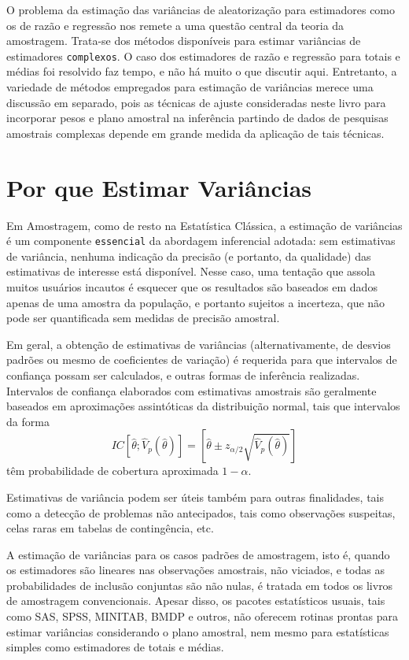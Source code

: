 \documentclass[]{book}
\numberwithin{example}{chapter}
\numberwithin{remark}{chapter}
\numberwithin{definition}{chapter}
\begin{document}
O problema da estimação das variâncias de aleatorização para estimadores
como os de razão e regressão nos remete a uma questão central da teoria
da amostragem. Trata-se dos métodos disponíveis para estimar variâncias
de estimadores \texttt{complexos}. O caso dos estimadores de razão e
regressão para totais e médias foi resolvido faz tempo, e não há muito o
que discutir aqui. Entretanto, a variedade de métodos empregados para
estimação de variâncias merece uma discussão em separado, pois as
técnicas de ajuste consideradas neste livro para incorporar pesos e
plano amostral na inferência partindo de dados de pesquisas amostrais
complexas depende em grande medida da aplicação de tais técnicas.

\section{Por que Estimar Variâncias}\label{por-que-estimar-variancias}

Em Amostragem, como de resto na Estatística Clássica, a estimação de
variâncias é um componente \texttt{essencial} da abordagem inferencial
adotada: sem estimativas de variância, nenhuma indicação da precisão (e
portanto, da qualidade) das estimativas de interesse está disponível.
Nesse caso, uma tentação que assola muitos usuários incautos é esquecer
que os resultados são baseados em dados apenas de uma amostra da
população, e portanto sujeitos a incerteza, que não pode ser
quantificada sem medidas de precisão amostral.

Em geral, a obtenção de estimativas de variâncias (alternativamente, de
desvios padrões ou mesmo de coeficientes de variação) é requerida para
que intervalos de confiança possam ser calculados, e outras formas de
inferência realizadas. Intervalos de confiança elaborados com
estimativas amostrais são geralmente baseados em aproximações
assintóticas da distribuição normal, tais que intervalos da forma \[
IC\left[ \widehat{\theta };\widehat{V}_{p}\left( \widehat{\theta }\right)
\right] =\left[ \widehat{\theta }\pm z_{\alpha /2}\sqrt{\widehat{V}%
_{p}\left( \widehat{\theta }\right) }\right] 
\] têm probabilidade de cobertura aproximada \(1-\alpha\).

Estimativas de variância podem ser úteis também para outras finalidades,
tais como a detecção de problemas não antecipados, tais como observações
suspeitas, celas raras em tabelas de contingência, etc.

A estimação de variâncias para os casos padrões de amostragem, isto é,
quando os estimadores são lineares nas observações amostrais, não
viciados, e todas as probabilidades de inclusão conjuntas são não nulas,
é tratada em todos os livros de amostragem convencionais. Apesar disso,
os pacotes estatísticos usuais, tais como SAS, SPSS, MINITAB, BMDP e
outros, não oferecem rotinas prontas para estimar variâncias
considerando o plano amostral, nem mesmo para estatísticas simples como
estimadores de totais e médias.
\end{document}
